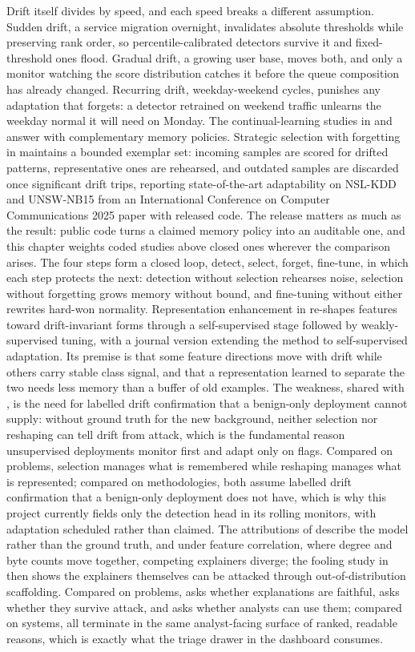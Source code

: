 Drift itself divides by speed, and each speed breaks a different assumption. Sudden drift, a service migration overnight, invalidates absolute thresholds while preserving rank order, so percentile-calibrated detectors survive it and fixed-threshold ones flood. Gradual drift, a growing user base, moves both, and only a monitor watching the score distribution catches it before the queue composition has already changed. Recurring drift, weekday-weekend cycles, punishes any adaptation that forgets: a detector retrained on weekend traffic unlearns the weekday normal it will need on Monday. The continual-learning studies in \cite{k34} and \cite{k35} answer with complementary memory policies. Strategic selection with forgetting in \cite{k34} maintains a bounded exemplar set: incoming samples are scored for drifted patterns, representative ones are rehearsed, and outdated samples are discarded once significant drift trips, reporting state-of-the-art adaptability on NSL-KDD and UNSW-NB15 from an International Conference on Computer Communications 2025 paper with released code. The release matters as much as the result: public code turns a claimed memory policy into an auditable one, and this chapter weights coded studies above closed ones wherever the comparison arises. The four steps form a closed loop, detect, select, forget, fine-tune, in which each step protects the next: detection without selection rehearses noise, selection without forgetting grows memory without bound, and fine-tuning without either rewrites hard-won normality. Representation enhancement in \cite{k35} re-shapes features toward drift-invariant forms through a self-supervised stage followed by weakly-supervised tuning, with a journal version extending the method to self-supervised adaptation. Its premise is that some feature directions move with drift while others carry stable class signal, and that a representation learned to separate the two needs less memory than a buffer of old examples. The weakness, shared with \cite{k34}, is the need for labelled drift confirmation that a benign-only deployment cannot supply: without ground truth for the new background, neither selection nor reshaping can tell drift from attack, which is the fundamental reason unsupervised deployments monitor first and adapt only on flags. Compared on problems, selection manages what is remembered while reshaping manages what is represented; compared on methodologies, both assume labelled drift confirmation that a benign-only deployment does not have, which is why this project currently fields only the detection head in its rolling monitors, with adaptation scheduled rather than claimed. The attributions of \cite{k29} describe the model rather than the ground truth, and under feature correlation, where degree and byte counts move together, competing explainers diverge; the fooling study in \cite{k37} then shows the explainers themselves can be attacked through out-of-distribution scaffolding. Compared on problems, \cite{k36} asks whether explanations are faithful, \cite{k37} asks whether they survive attack, and \cite{k38} asks whether analysts can use them; compared on systems, all terminate in the same analyst-facing surface of ranked, readable reasons, which is exactly what the triage drawer in the dashboard consumes.

